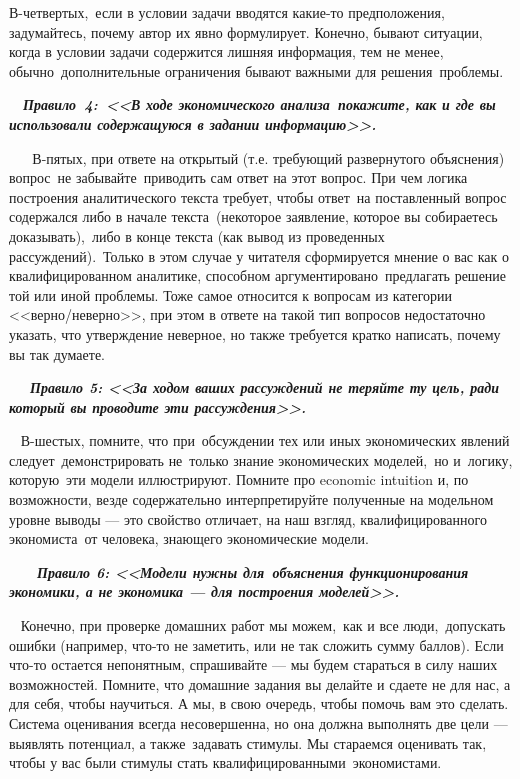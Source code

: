 \documentclass[a4paper,12pt]{article}
\theoremstyle{plain} %
\theoremstyle{definition} %
\theoremstyle{remark} %
\begin{document}
В-четвертых, если в условии задачи вводятся какие-то предположения, задумайтесь, почему автор их явно формулирует. Конечно, бывают ситуации, когда в условии задачи содержится лишняя информация, тем не менее, обычно дополнительные ограничения бывают важными для решения проблемы. 

  \textbf{\textit{Правило 4: <<В ходе экономического анализа покажите, как и где вы использовали содержащуюся в задании информацию>>.
}} 

 
 
В-пятых, при ответе на открытый (т.е. требующий развернутого объяснения) вопрос не забывайте приводить сам ответ на этот вопрос. При чем логика построения аналитического текста требует, чтобы ответ на поставленный вопрос содержался либо в начале текста (некоторое заявление, которое вы собираетесь доказывать), либо в конце текста (как вывод из проведенных рассуждений). Только в этом случае у читателя сформируется мнение о вас как о квалифицированном аналитике, способном аргументировано предлагать решение той или иной проблемы. Тоже самое относится к вопросам из категории <<верно/неверно>>, при этом в ответе на такой тип вопросов недостаточно указать, что утверждение неверное, но также требуется кратко написать, почему вы так думаете.

   \textbf{\textit{Правило 5: <<За ходом ваших рассуждений не теряйте ту цель, ради который вы проводите эти рассуждения>>.
}}


 
В-шестых, помните, что при обсуждении тех или иных экономических явлений следует демонстрировать не только знание экономических моделей, но и логику, которую эти модели иллюстрируют. Помните про economic intuition и, по возможности, везде содержательно интерпретируйте полученные на модельном уровне выводы --- это свойство отличает, на наш взгляд, квалифицированного экономиста от человека, знающего экономические модели.   

    \textbf{\textit{Правило 6: <<Модели нужны для объяснения функционирования экономики, а не экономика --- для построения моделей>>. 
}}


 
Конечно, при проверке домашних работ мы можем, как и все люди, допускать ошибки (например, что-то не заметить, или не так сложить сумму баллов). Если что-то остается непонятным, спрашивайте --- мы будем стараться в силу наших возможностей. Помните, что домашние задания вы делайте и сдаете не для нас, а для себя, чтобы научиться. А мы, в свою очередь, чтобы помочь вам это сделать. Система оценивания всегда несовершенна, но она должна выполнять две цели --- выявлять потенциал, а также задавать стимулы. Мы стараемся оценивать так, чтобы у вас были стимулы стать квалифицированными экономистами.
\end{document}
